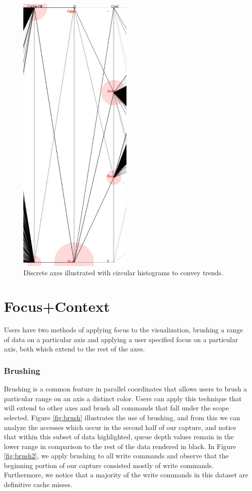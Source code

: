\documentclass[12pt]{ucthesis}
\begin{document}
\begin{figure}[h!]
 \centering
 \includegraphics[width=0.5\textwidth]{images/discrete.pdf}
 \caption{Discrete axes illustrated with circular histograms to convey trends.}
 \label{fig:histograms}
\end{figure}

\section{Focus+Context}
Users have two methods of applying focus to the visualization, brushing a range of data on a particular axis and applying a user specified focus on a particular axis, both which extend to the rest of the axes.

\subsubsection{Brushing}
Brushing is a common feature in parallel coordinates that allows users to brush a particular range on an axis a distinct color. Users can apply this technique that will extend to other axes and brush all commands that fall under the scope selected. Figure \ref{fig:brush} illustrates the use of brushing, and from this we can analyze the accesses which occur in the second half of our capture, and notice that within this subset of data highlighted, queue depth values remain in the lower range in comparison to the rest of the data rendered in black. In Figure \ref{fig:brush2}, we apply brushing to all write commands and observe that the beginning portion of our capture consisted mostly of write commands. Furthermore, we notice that a majority of the write commands in this dataset are definitive cache misses.
\end{document}
